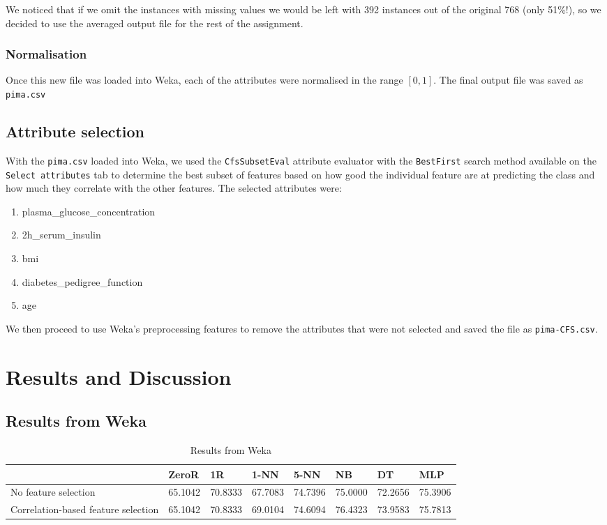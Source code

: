 \documentclass{article}
\renewcommand{\tt}{\texttt}
\begin{document}
We noticed that if we omit the instances with missing values we would be left with 392 instances out of the original 768 (only 51\%!), so we decided to use the averaged output file for the rest of the assignment.

\subsubsection{Normalisation}
Once this new file was loaded into Weka, each of the attributes were normalised in the range $[0, 1]$. The final output file was saved as \tt{pima.csv}

\subsection{Attribute selection}
With the \tt{pima.csv} loaded into Weka, we used the \tt{CfsSubsetEval} attribute evaluator with the \tt{BestFirst} search method available on the \tt{Select attributes} tab to determine the best subset of features based on how good the individual feature are at predicting the class and how much they correlate with the other features.
The selected attributes were:
\begin{enumerate}[1.]
\item plasma\_glucose\_concentration
\item 2h\_serum\_insulin
\item bmi
\item diabetes\_pedigree\_function
\item age
\end{enumerate} 

We then proceed to use Weka's preprocessing features to remove the attributes that were not selected and saved the file as \tt{pima-CFS.csv}.

\section{Results and Discussion}

\subsection{Results from Weka}
\begin{table}[h]
\begin{tabular}{llllllll}
\hline
 									& ZeroR    & 1R         & 1-NN     & 5-NN     & NB         & DT        & MLP \\ \hline
No feature selection 					& 65.1042 & 70.8333 & 67.7083 & 74.7396 & 75.0000 & 72.2656 & 75.3906 \\
Correlation-based feature selection 	& 65.1042 & 70.8333 & 69.0104 & 74.6094 & 76.4323 & 73.9583 & 75.7813 \\ \hline
\end{tabular}
\caption{Results from Weka}
\end{table}
\end{document}
